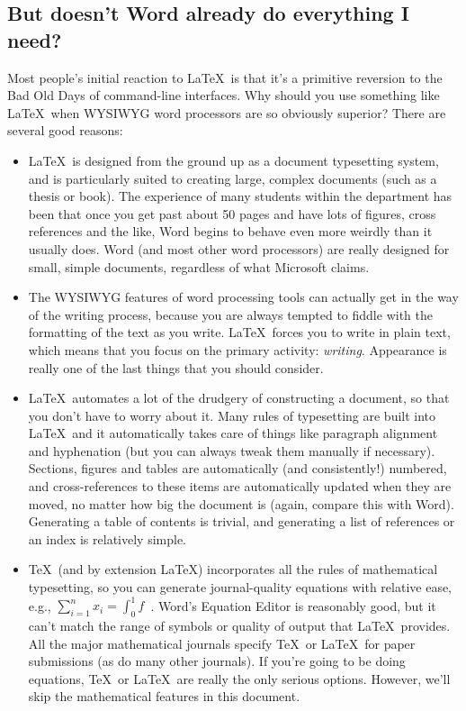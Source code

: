 \documentclass[12pt,a4paper,pdftex]{article}
\begin{document}
\subsection{But doesn't Word already do everything I need?}
\label{sec:Word}

Most people's initial reaction to \LaTeX\ is that it's a primitive
reversion to the Bad Old Days of command-line interfaces. Why should you
use something like \LaTeX\ when WYSIWYG word processors are so obviously
superior? There are several good reasons:

\begin{itemize}

	\item \LaTeX\ is designed from the ground up as a document
	typesetting system, and is particularly suited to creating large,
	complex documents (such as a thesis or book). The experience of many
	students within the department has been that once you get past about
	50 pages and have lots of figures, cross references and the like,
	Word begins to behave even more weirdly than it usually does. Word
	(and most other word processors) are really designed for small,
	simple documents, regardless of what Microsoft claims.

	\item The WYSIWYG features of word processing tools can actually get
	in the way of the writing process, because you are always tempted to
	fiddle with the formatting of the text as you write. \LaTeX\ forces
	you to write in plain text, which means that you focus on the
	primary activity: \emph{writing}. Appearance is really one of the
	last things that you should consider.

	\item \LaTeX\ automates a lot of the drudgery of constructing a
	document, so that you don't have to worry about it. Many rules of
	typesetting are built into \LaTeX\, and it automatically takes care
	of things like paragraph alignment and hyphenation (but you can
	always tweak them manually if necessary). Sections, figures and
	tables are automatically (and consistently!) numbered, and
	cross-references to these items are automatically updated when they
	are moved, no matter how big the document is (again, compare this
	with Word). Generating a table of contents is trivial, and
	generating a list of references or an index is relatively simple.

	\item \TeX\ (and by extension \LaTeX) incorporates all the rules of
	mathematical typesetting, so you can generate journal-quality
	equations with relative ease, e.g., \(\sum_{i=1}^{n} x_{i} =
	\int_{0}^{1} f\)~\cite{UsersGuide}. Word's Equation Editor is
	reasonably good, but it can't match the range of symbols or quality
	of output that \LaTeX\ provides. All the major mathematical journals
	specify \TeX\ or \LaTeX\ for paper submissions (as do many other
	journals). If you're going to be doing equations, \TeX\ or \LaTeX\
	are really the only serious options. However, we'll skip the
	mathematical features in this document.


\end{itemize}
\end{document}
